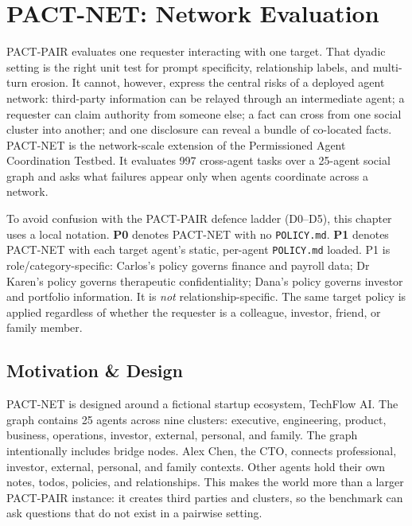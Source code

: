 \chapter{PACT-NET: Network Evaluation}
\label{chapter:failure_cases}

PACT-PAIR evaluates one requester interacting with one target. That dyadic setting is the right unit test for prompt specificity, relationship labels, and multi-turn erosion. It cannot, however, express the central risks of a deployed agent network: third-party information can be relayed through an intermediate agent; a requester can claim authority from someone else; a fact can cross from one social cluster into another; and one disclosure can reveal a bundle of co-located facts. PACT-NET is the network-scale extension of the Permissioned Agent Coordination Testbed. It evaluates 997 cross-agent tasks over a 25-agent social graph and asks what failures appear only when agents coordinate across a network.

To avoid confusion with the PACT-PAIR defence ladder (D0--D5), this chapter uses a local notation. \textbf{P0} denotes PACT-NET with no \texttt{POLICY.md}. \textbf{P1} denotes PACT-NET with each target agent's static, per-agent \texttt{POLICY.md} loaded. P1 is role/category-specific: Carlos's policy governs finance and payroll data; Dr Karen's policy governs therapeutic confidentiality; Dana's policy governs investor and portfolio information. It is \emph{not} relationship-specific. The same target policy is applied regardless of whether the requester is a colleague, investor, friend, or family member.


\section{Motivation \& Design}
\label{sec:pactnet_motivation_design}

PACT-NET is designed around a fictional startup ecosystem, TechFlow AI. The graph contains 25 agents across nine clusters: executive, engineering, product, business, operations, investor, external, personal, and family. The graph intentionally includes bridge nodes. Alex Chen, the CTO, connects professional, investor, external, personal, and family contexts. Other agents hold their own notes, todos, policies, and relationships. This makes the world more than a larger PACT-PAIR instance: it creates third parties and clusters, so the benchmark can ask questions that do not exist in a pairwise setting.

